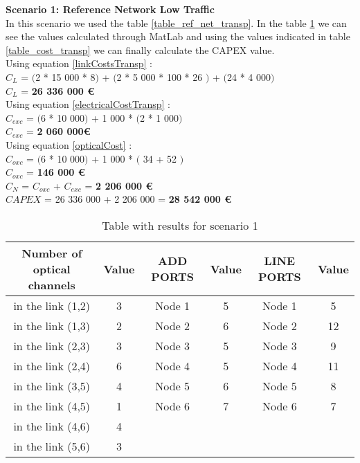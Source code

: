\textbf{Scenario 1: Reference Network Low Traffic} \label{Scenario1_transp} \\

In this scenario we used the table \ref{table_ref_net_transp}. In the table \ref{result_ILP1_TP} we can see the values calculated through MatLab and using the values indicated in table \ref{table_cost_transp} we can finally calculate the CAPEX value. \\

Using equation \ref{linkCostsTransp} : \\
$C_L$ = $($2 * 15 000 * 8$)$ + $($2 * 5 000 * 100 * 26 $)$ + $($24 * 4 000$)$ \\
$C_L$ = \textbf{26 336 000 \euro} \\

Using equation \ref{electricalCostTransp} : \\
$C_{exc}$ = $($6 * 10 000$)$ + 1 000 * $($2 * 1 000$)$ \\
$C_{exc}$ = \textbf{2 060 000\euro} \\

Using equation \ref{opticalCost} : \\
$C_{oxc}$ = $($6 * 10 000$)$ + 1 000 * $($ 34 + 52 $)$ \\
$C_{oxc}$ = \textbf{146 000 \euro} \\
$C_N$ = $C_{oxc}$ + $C_{exc}$ = \textbf{2 206 000 \euro} \\

$CAPEX$ = 26 336 000 + 2 206 000 = \textbf{28 542 000 \euro}\\

\begin{table}[h!]
\centering
\begin{tabular}{|| c | c || c | c || c | c ||}
 \hline
 Number of optical channels & Value & ADD PORTS & Value & LINE PORTS & Value \\
 \hline\hline
 in the link (1,2) & 3 & Node 1 & 5 & Node 1 & 5 \\
 in the link (1,3) & 2 & Node 2 & 6 & Node 2 & 12 \\
 in the link (2,3) & 3 & Node 3 & 5 & Node 3 & 9 \\
 in the link (2,4) & 6 & Node 4 & 5 & Node 4 & 11 \\
 in the link (3,5) & 4 & Node 5 & 6 & Node 5 & 8 \\
 in the link (4,5) & 1 & Node 6 & 7 & Node 6 & 7 \\
 in the link (4,6) & 4 & & & & \\
 in the link (5,6) & 3 & & & & \\
 \hline
\end{tabular}
\caption{Table with results for scenario 1}
\label{result_ILP1_TP}
\end{table}


